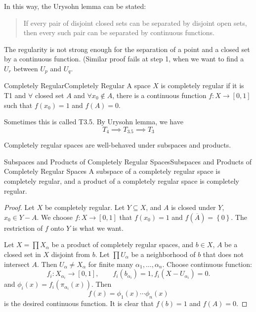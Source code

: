 \documentclass[../main.tex]{subfiles}
\begin{document}
In this way, the Urysohn lemma can be stated:
\begin{quote}
	If every pair of disjoint closed sets can be separated by disjoint open sets, then every such pair can be separated by continuous functions.
\end{quote}

\begin{remark}
The regularity is not strong enough for the separation of a point and a closed set by a continuous function. (Similar proof fails at step 1, when we want to find a $U_r$ between $U_p$ and $U_q$.
\end{remark}

\begin{definition}{Completely Regular}{Completely Regular}
	A space $X$ is completely regular if it is T1 and $\forall $ closed set $A$ and $\forall x_0\notin A$, there is a continuous function $f: X \rightarrow [0,1]$ such that $f(x_0)=1$ and $f(A) = 0$.
\end{definition}

Sometimes this is called T3.5. By Urysohn lemma, we have
\begin{equation*}
	T_4 \implies T_{3.5} \implies T_3
\end{equation*}

Completely regular spaces are well-behaved under subspaces and products.
\begin{theorem}{Subspaces and Products of Completely Regular Spaces}{Subspaces and Products of Completely Regular Spaces}
	A subspace of a completely regular space is completely regular, and a product of a completely regular space is completely regular.
\end{theorem}
\begin{proof}
	Let $X$ be completely regular. Let $Y \subseteq X$, and $A$ is closed under $Y$, $x_0\in Y-A$. We choose $f:X \rightarrow [0,1]$ that $f(x_0)=1$ and $f(\overline{A}) = \left\{ 0 \right\}$. The restriction of $f$ onto $Y$ is what we want.
	
	Let $X = \prod X_{\alpha}$ be a product of completely regular spaces, and $b\in X$, $A$ be a closed set in $X$ disjoint from $b$. Let $\prod U_{\alpha}$ be a neighborhood of $b$ that does not intersect $A$. Then $U_{\alpha}\neq X_{\alpha}$ for finite many $\alpha_1, \ldots ,\alpha_n$. Choose continuous function:
	\begin{equation*}
		f_i : X_{\alpha_i} \rightarrow [0,1], \qquad f_i(b_{\alpha_i}) = 1, f_i(X-U_{\alpha_i}) = 0.
	\end{equation*}
	and $\phi_i(x) = f_i(\pi_{\alpha_i}(x))$. Then
	\begin{equation*}
		f(x) = \phi_1(x) \cdots \phi_n(x)
	\end{equation*}
	is the desired continuous function. It is clear that $f(b) = 1$ and $f(A) = 0$.
\end{proof}
\end{document}
